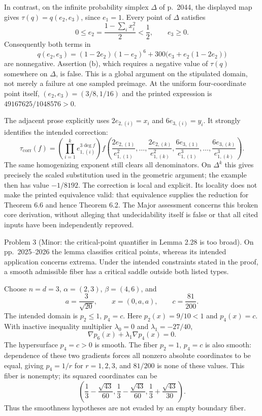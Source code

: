 \documentclass[10pt]{article}
\begin{document}
In contrast, on the infinite probability simplex \(\Delta\) of p. 2044, the displayed map gives \(\tau(q)=q(e_2,e_3)\), since \(e_1=1\). Every point of \(\Delta\) satisfies \[0\leq e_2=\frac{1-\sum_i x_i^2}{2}<\frac12,\qquad e_3\geq0.\] Consequently both terms in \[q(e_2,e_3)
   =(1-2e_2)(1-e_2)^6
     +300\bigl(e_3+e_2(1-2e_2)\bigr)\] are nonnegative. Assertion (b), which requires a negative value of \(\tau(q)\) somewhere on \(\Delta\), is false. This is a global argument on the stipulated domain, not merely a failure at one sampled preimage. At the uniform four-coordinate point itself, \((e_2,e_3)=(3/8,1/16)\) and the printed expression is \(49167625/1048576>0\).\par
The adjacent prose explicitly uses \(2e_{2,(i)}=x_i\) and \(6e_{3,(i)}=y_i\). It strongly identifies the intended correction: \[\tau_{\mathrm{corr}}(f)=
 \left(\prod_{i=1}^{k}e_{1,(i)}^{3\deg f}\right)
 f\left(
 \frac{2e_{2,(1)}}{e_{1,(1)}^2},\ldots,
 \frac{2e_{2,(k)}}{e_{1,(k)}^2},
 \frac{6e_{3,(1)}}{e_{1,(1)}^3},\ldots,
 \frac{6e_{3,(k)}}{e_{1,(k)}^3}\right).\] The same homogenizing exponent still clears all denominators. On \(\Delta^k\) this gives precisely the scaled substitution used in the geometric argument; the example then has value \(-1/8192\). The correction is local and explicit. Its locality does not make the printed equivalence valid: that equivalence supplies the reduction for Theorem 6.6 and hence Theorem 6.2. The Major assessment concerns this broken core derivation, without alleging that undecidability itself is false or that all cited inputs have been independently reproved.\par
Problem 3 (Minor: the critical-point quantifier in Lemma 2.28 is too broad).  On pp. 2025–2026 the lemma classifies critical points, whereas its intended application concerns extrema. Under the intended constraints stated in the proof, a smooth admissible fiber has a critical saddle outside both listed types.\par
Choose \(n=d=3\), \(\alpha=(2,3)\), \(\beta=(4,6)\), and \[a=\frac{3}{\sqrt{20}},\qquad
 x=(0,a,a),\qquad
 c=\frac{81}{200}.\] The intended domain is \(p_2\leq1\), \(p_4=c\). Here \(p_2(x)=9/10<1\) and \(p_4(x)=c\). With inactive inequality multiplier \(\lambda_0=0\) and \(\lambda_1=-27/40\), \[\nabla p_6(x)+\lambda_1\nabla p_4(x)=0.\] The hypersurface \(p_4=c>0\) is smooth. The fiber \(p_2=1\), \(p_4=c\) is also smooth: dependence of these two gradients forces all nonzero absolute coordinates to be equal, giving \(p_4=1/r\) for \(r=1,2,3\), and \(81/200\) is none of these values. This fiber is nonempty; its squared coordinates can be \[\left(\frac13-\frac{\sqrt{43}}{60},
       \frac13-\frac{\sqrt{43}}{60},
       \frac13+\frac{\sqrt{43}}{30}\right).\] Thus the smoothness hypotheses are not evaded by an empty boundary fiber.\par
\end{document}
